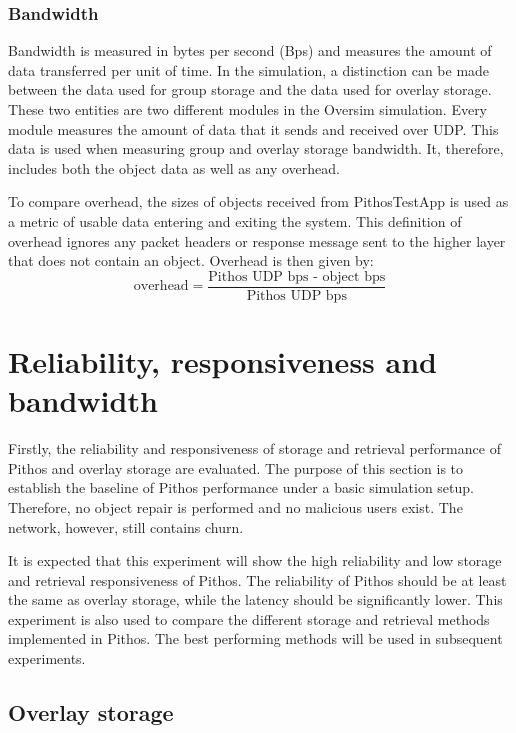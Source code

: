 \subsubsection{Bandwidth}

Bandwidth is measured in bytes per second (Bps) and measures the amount of data transferred per unit of time. In the simulation, a distinction can be made between the data used for group storage and the data used for overlay storage. These two entities are two different modules in the Oversim simulation. Every module measures the amount of data that it sends and received over UDP. This data is used when measuring group and overlay storage bandwidth. It, therefore, includes both the object data as well as any overhead.

To compare overhead, the sizes of objects received from PithosTestApp is used as a metric of usable data entering and exiting the system. This definition of overhead ignores any packet headers or response message sent to the higher layer that does not contain an object. Overhead is then given by:
%
\begin{equation}
\textrm{overhead} = \frac{\textrm{Pithos UDP bps - object bps}}{\textrm{Pithos UDP bps}}
\end{equation}

\section{Reliability, responsiveness and bandwidth}

Firstly, the reliability and responsiveness of storage and retrieval performance of Pithos and overlay storage are evaluated. The purpose of this section is to establish the baseline of Pithos performance under a basic simulation setup. Therefore, no object repair is performed and no malicious users exist. The network, however, still contains churn.

It is expected that this experiment will show the high reliability and low storage and retrieval responsiveness of Pithos. The reliability of Pithos should be at least the same as overlay storage, while the latency should be significantly lower. This experiment is also used to compare the different storage and retrieval methods implemented in Pithos. The best performing methods will be used in subsequent experiments.

\subsection{Overlay storage}
\label{overlay_results}


